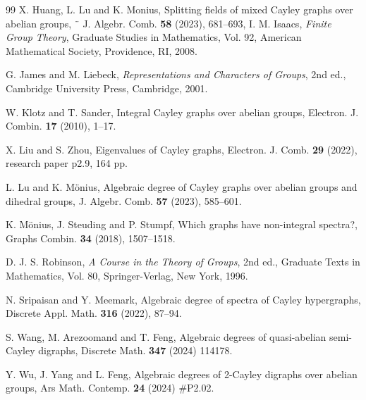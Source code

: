 \documentclass{amsart}
\begin{document}
\begin{thebibliography}{99}
	X. Huang, L. Lu and K. Monius, Splitting fields of mixed Cayley graphs over abelian groups, ¨
	J. Algebr. Comb. \textbf{58} (2023), 681--693,
	I. M. Isaacs,
	\emph{Finite Group Theory},
	Graduate Studies in Mathematics, Vol. 92,
	American Mathematical Society, Providence, RI, 2008.
	
	G. James and M. Liebeck,
	\emph{Representations and Characters of Groups},
	2nd ed.,
	Cambridge University Press, Cambridge, 2001.
	
	W. Klotz and T. Sander,
	Integral Cayley graphs over abelian groups,
	Electron. J. Combin. \textbf{17} (2010), 1--17.
	
	X. Liu and S. Zhou, Eigenvalues of Cayley graphs, Electron. J. Comb. \textbf{29} (2022), research
	paper p2.9, 164 pp.
	
	L. Lu and K. M\"{o}nius,
	Algebraic degree of Cayley graphs over abelian groups and dihedral groups,
	J. Algebr. Comb. \textbf{57} (2023), 585--601.
	
	K. Mönius, J. Steuding and P. Stumpf,
	Which graphs have non-integral spectra?,
	Graphs Combin. \textbf{34} (2018), 1507--1518.
	
	D. J. S. Robinson,
	\emph{A Course in the Theory of Groups},
	2nd ed.,
	Graduate Texts in Mathematics, Vol. 80,
	Springer-Verlag, New York, 1996.
	
N. Sripaisan and Y. Meemark, Algebraic degree of spectra of Cayley hypergraphs, Discrete
Appl. Math. \textbf{316} (2022), 87--94.

S. Wang, M. Arezoomand and T. Feng, Algebraic degrees of quasi-abelian semi-Cayley digraphs, Discrete Math. \textbf{347} (2024) 114178.

Y. Wu, J. Yang and L. Feng, Algebraic degrees of 2-Cayley digraphs over abelian groups,
Ars Math. Contemp. \textbf{24} (2024) \#P2.02.	
\end{thebibliography}
\end{document}
